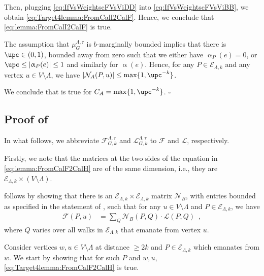 \documentclass[11pt,reqno]{amsart}
\numberwithin{equation}{section}
\newcommand{\cE}{{\mathcal{E}}}
\newcommand{\cF}{{\mathcal{F}}}
\newcommand{\cL}{{\mathcal{L}}}
\newcommand{\cN}{{\mathcal{N}}}
\newcommand{\applegreen}[1]{ {\color{applegreen}#1}}
\newcommand{\amethyst}[1]{{\color{amethyst}#1} }
\newcommand{\blue}[1]{{\color{blue}#1}}
\newcommand{\bluepigment}[1]{{\color{blue(pigment)}#1}}
\newcommand{\goldenbrown}[1]{{\color{goldenbrown}#1}}
\newcommand{\iris}[1]{{\color{iris}#1}}
\newcommand{\red}[1]{{\color{red}#1}}
\newcommand{\rosegold}[1]{{\color{rosegold}#1}}
\newcommand{\ExtV}{\iris{\cE}}
\newcommand{\abs}[1]{\blue{|}#1\blue{|}}
\renewcommand{\applegreen}[1]{#1}
\renewcommand{\amethyst}[1]{#1}
\renewcommand{\blue}[1]{#1}
\renewcommand{\bluepigment}[1]{#1}
\renewcommand{\goldenbrown}[1]{#1}
\renewcommand{\iris}[1]{#1}
\renewcommand{\red}[1]{#1}
\renewcommand{\rosegold}[1]{#1}
\newcommand{\ke}{\blue{e}}
\newcommand{\kk}{\bluepigment{k}}
\newcommand{\kP}{\goldenbrown{P}}
\newcommand{\kQ}{\amethyst{Q}}
\newcommand{\ku}{\red{u}}
\newcommand{\kw}{\blue{w}}
\renewcommand{\ke}{e}
\renewcommand{\kk}{k}
\renewcommand{\kP}{P}
\renewcommand{\kQ}{Q}
\renewcommand{\ku}{u}
\renewcommand{\kw}{w}
\newcommand{\ExtdInfMatrix}{\rosegold{\cL}}
\newcommand{\ExtdInfMatrixF}{\applegreen{\cL}^{\Lambda,\tau}_{G,\kk}}
\newcommand{\SemExtdInfMatrix}{\cF}
\newcommand{\SymWeightMA}{\cN_A}
\newcommand{\SymWeightMB}{\cN_B}
\newcommand{\infweight}{\upalpha}
\begin{document}
Then, plugging \eqref{eq:IfVsWeightscFVsViDD} into \eqref{eq:IfVsWeightscFVsViBB}, we obtain 
\eqref{eq:Target4lemma:FromCalI2CalF}. Hence, we conclude that \eqref{eq:lemma:FromCalI2CalF} is 
true.




The assumption that $\mu^{\Lambda,\tau}_G$ is $b$-marginally bounded implies that 
there is $\upc \in (0,1)$, bounded away from zero such that we either have $\infweight_{\kP}(\ke)=0$, or 
$\upc\leq \abs{\infweight_{\kP}(\ke)} \leq 1$ and similarly for $\infweight(\ke)$. 
%
Hence, for any $\kP\in \ExtV_{\Lambda,k}$ and any 
vertex $\ku\in V\setminus \Lambda$, we have $| \SymWeightMA(\kP, \ku)| \leq \max\{1,\upc^{-\kk}\}$. 
%

We conclude that  is true for $C_A=\max\{1,\upc^{- \kk}\}$.
\hfill $\square$ 


\subsection{Proof of } \label{sec:lemma:FromCalF2CalH}
In what follows, we abbreviate $\SemExtdInfMatrix^{\Lambda,\tau}_{G,\kk}$ 
and $\ExtdInfMatrixF$ to $\SemExtdInfMatrix$ and $\ExtdInfMatrix$, respectively. 



Firstly, we note that the matrices at the two sides of the equation in \eqref{eq:lemma:FromCalF2CalH} are 
of the same dimension, i.e., they are $\ExtV_{\Lambda, \kk}\times (V\setminus \Lambda)$.



 
 follows by showing that there is an $\ExtV_{\Lambda, \kk}\times \ExtV_{\Lambda,\kk}$ matrix 
$\SymWeightMB$, with entries bounded as specified in the statement of , 
such that for any $\ku\in V\setminus \Lambda$ and $\kP\in \ExtV_{\Lambda, \kk}$, we have
\begin{align}\label{eq:Target4lemma:FromCalF2CalH}
\SemExtdInfMatrix(\kP, \ku) &= \sum\nolimits_{\kQ} 
\SymWeightMB(\kP, \kQ)\cdot \ExtdInfMatrix(\kP, \kQ)
\enspace,
\end{align}
% 
%
where $\kQ$ varies over all walks in $ \ExtV_{\Lambda,\kk}$ that emanate from vertex $\ku$.


Consider vertices $\kw, \ku\in V\setminus \Lambda$ at distance $\geq 2k$
and $\kP\in \ExtV_{\Lambda,\kk}$ which emanates from $\kw$. We start by showing that 
for such $\kP$ and $\kw, \ku$, \eqref{eq:Target4lemma:FromCalF2CalH} is true. 
\end{document}
